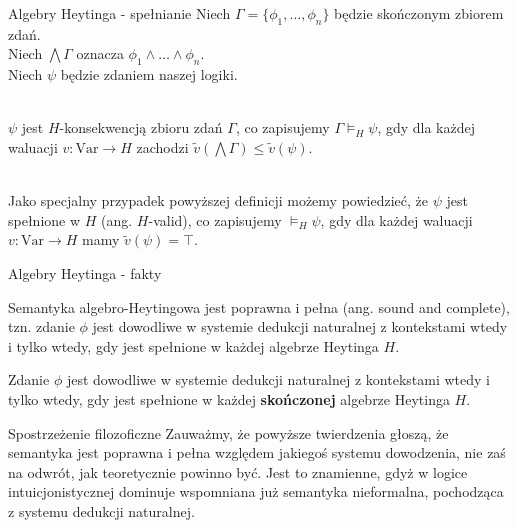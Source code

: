 \documentclass{beamer}
\begin{document}
\begin{frame}{Algebry Heytinga - spełnianie}
Niech $\Gamma = \{\phi_1, \dots, \phi_n\}$ będzie skończonym zbiorem zdań. \\
Niech $\bigwedge \Gamma$ oznacza $\phi_1 \land \dots \land \phi_n$. \\
Niech $\psi$ będzie zdaniem naszej logiki. \\~\

$\psi$ jest $H$-konsekwencją zbioru zdań $\Gamma$, co zapisujemy $\Gamma \models_H \psi$, gdy dla każdej waluacji $v: \text{Var} \to H$ zachodzi $\tilde{v}(\bigwedge \Gamma) \leq \tilde{v}(\psi)$. \\~\

Jako specjalny przypadek powyższej definicji możemy powiedzieć, że $\psi$ jest spełnione w $H$ (ang. $H$-valid), co zapisujemy $\models_H \psi$, gdy dla każdej waluacji $v: \text{Var} \to H$ mamy $\tilde{v}(\psi) = \top$.
\end{frame}

\begin{frame}{Algebry Heytinga - fakty}
\begin{theorem}
Semantyka algebro-Heytingowa jest poprawna i pełna (ang. sound and complete), tzn. zdanie $\phi$ jest dowodliwe w systemie dedukcji naturalnej z kontekstami wtedy i tylko wtedy, gdy jest spełnione w każdej algebrze Heytinga $H$.
\end{theorem}
\begin{theorem}
Zdanie $\phi$ jest dowodliwe w systemie dedukcji naturalnej z kontekstami wtedy i tylko wtedy, gdy jest spełnione w każdej \textbf{skończonej} algebrze Heytinga $H$.
\end{theorem}
\end{frame}

\begin{frame}{Spostrzeżenie filozoficzne}
Zauważmy, że powyższe twierdzenia głoszą, że semantyka jest poprawna i pełna względem jakiegoś systemu dowodzenia, nie zaś na odwrót, jak teoretycznie powinno być. Jest to znamienne, gdyż w logice intuicjonistycznej dominuje wspomniana już semantyka nieformalna, pochodząca z systemu dedukcji naturalnej.
\end{frame}
\end{document}
